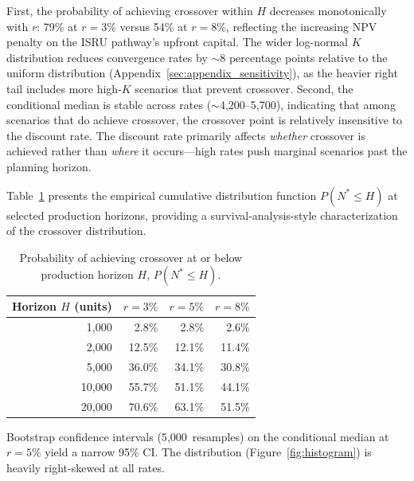 \documentclass[preprint,12pt]{elsarticle}
\begin{document}
First, the probability of achieving crossover within $H$ decreases monotonically with $r$: 79\% at $r = 3\%$ versus 54\% at $r = 8\%$, reflecting the increasing NPV penalty on the ISRU pathway's upfront capital. The wider log-normal $K$ distribution reduces convergence rates by $\sim$8 percentage points relative to the uniform distribution (Appendix~\ref{sec:appendix_sensitivity}), as the heavier right tail includes more high-$K$ scenarios that prevent crossover. Second, the conditional median is stable across rates ($\sim$4{,}200--5{,}700), indicating that among scenarios that do achieve crossover, the crossover point is relatively insensitive to the discount rate. The discount rate primarily affects \emph{whether} crossover is achieved rather than \emph{where} it occurs---high rates push marginal scenarios past the planning horizon.

Table~\ref{tab:convergence} presents the empirical cumulative distribution function $P(N^* \leq H)$ at selected production horizons, providing a survival-analysis-style characterization of the crossover distribution.

\begin{table}[htbp]
\centering
\caption{Probability of achieving crossover at or below production horizon $H$, $P(N^* \leq H)$.}
\label{tab:convergence}
\small
\begin{tabular}{@{}rrrr@{}}
\toprule
Horizon $H$ (units) & $r = 3\%$ & $r = 5\%$ & $r = 8\%$ \\
\midrule
1{,}000  & 2.8\% & 2.8\% & 2.6\% \\
2{,}000  & 12.5\% & 12.1\% & 11.4\% \\
5{,}000  & 36.0\% & 34.1\% & 30.8\% \\
10{,}000 & 55.7\% & 51.1\% & 44.1\% \\
20{,}000 & 70.6\% & 63.1\% & 51.5\% \\
\bottomrule
\end{tabular}
\end{table}

Bootstrap confidence intervals (5{,}000~resamples) on the conditional median at $r = 5\%$ yield a narrow 95\% CI. The distribution (Figure~\ref{fig:histogram}) is heavily right-skewed at all rates.
\end{document}
